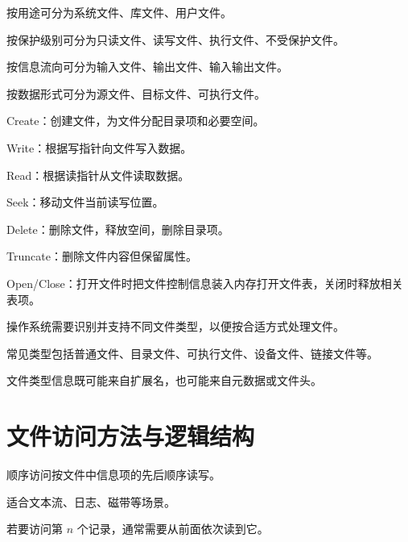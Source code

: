 \begin{points}
  \item 按用途可分为系统文件、库文件、用户文件。
  \item 按保护级别可分为只读文件、读写文件、执行文件、不受保护文件。
  \item 按信息流向可分为输入文件、输出文件、输入输出文件。
  \item 按数据形式可分为源文件、目标文件、可执行文件。
\end{points}


\begin{points}
  \item Create：创建文件，为文件分配目录项和必要空间。
  \item Write：根据写指针向文件写入数据。
  \item Read：根据读指针从文件读取数据。
  \item Seek：移动文件当前读写位置。
  \item Delete：删除文件，释放空间，删除目录项。
  \item Truncate：删除文件内容但保留属性。
  \item Open/Close：打开文件时把文件控制信息装入内存打开文件表，关闭时释放相关表项。
\end{points}


\begin{points}
  \item 操作系统需要识别并支持不同文件类型，以便按合适方式处理文件。
  \item 常见类型包括普通文件、目录文件、可执行文件、设备文件、链接文件等。
  \item 文件类型信息既可能来自扩展名，也可能来自元数据或文件头。
\end{points}


\section{文件访问方法与逻辑结构}
\begin{points}
  \item 顺序访问按文件中信息项的先后顺序读写。
  \item 适合文本流、日志、磁带等场景。
  \item 若要访问第 $n$ 个记录，通常需要从前面依次读到它。
\end{points}


